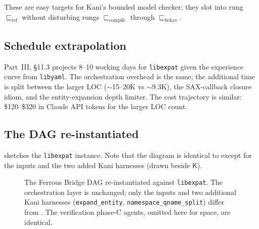 \documentclass[12pt]{article}
\theoremstyle{definition}
\theoremstyle{remark}
\newcommand{\libyaml}{\texttt{libyaml}}
\newcommand{\libexpat}{\texttt{libexpat}}
\newcommand{\Agent}[1]{\ensuremath{\mathsf{#1}}}
\newcommand{\Artifact}[1]{\ensuremath{\mathsf{#1}}}
\newcommand{\Compile}{\ensuremath{\sqsubseteq_{\!\mathrm{compile}}}}
\newcommand{\Behav}{\ensuremath{\sqsubseteq_{\!\mathrm{behav}}}}
\newcommand{\Refine}{\ensuremath{\sqsubseteq_{\!\mathrm{ref}}}}
\newcommand{\CSrc}{\Artifact{CSource}}
\newcommand{\CAB}{\Artifact{CAB}}
\newcommand{\Scaff}{\Artifact{RustScaffold}}
\newcommand{\RUnit}{\Artifact{RustUnit}}
\begin{document}
These are easy targets for Kani's bounded model checker; they slot
into rung \(\Refine\) without disturbing rungs \(\Compile\) through
\(\Behav\).

\subsection{Schedule extrapolation}

Part~III, \S{}11.3 projects 8--10 working days for \libexpat{} given
the experience curve from \libyaml{}. The orchestration overhead is
the same; the additional time is split between the larger LOC
(\(\sim\)15--20K vs \(\sim\)9.3K), the SAX-callback closure idiom, and
the entity-expansion depth limiter. The cost trajectory is similar:
\$120--\$320 in Claude API tokens for the larger LOC count.

\subsection{The DAG re-instantiated}

 sketches the \libexpat{} instance. Note that the
diagram is identical to  except for the inputs and the
two added Kani harnesses (drawn beside \(\Agent{K}\)).

\begin{figure}[h]
\centering
{}
\caption{The Ferrous Bridge DAG re-instantiated against \libexpat{}.
The orchestration layer is unchanged; only the inputs and two
additional Kani harnesses (\texttt{expand\_entity},
\texttt{namespace\_qname\_split}) differ from
. The verification phase-C agents, omitted here for
space, are identical.}
\label{fig:dag-expat}
\end{figure}
\end{document}
